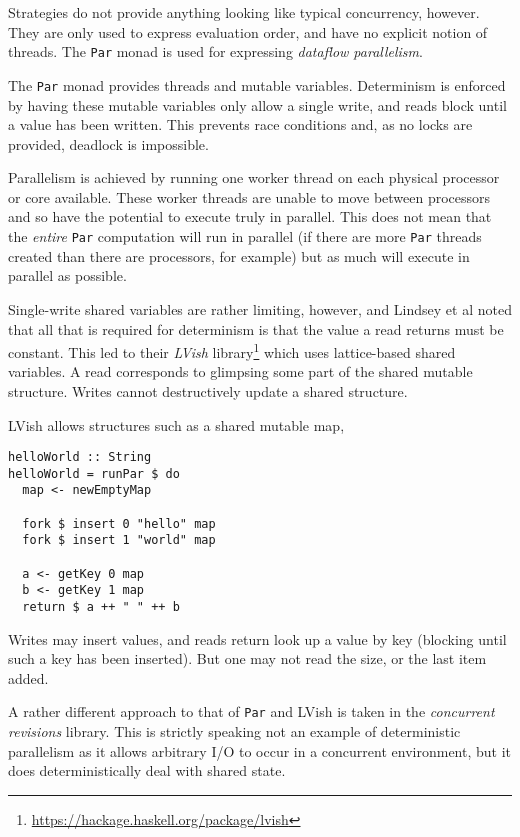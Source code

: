 Strategies do not provide anything looking like typical concurrency,
however. They are only used to express evaluation order, and have no
explicit notion of threads. The \verb|Par| monad\cite{parmonad} is
used for expressing \textit{dataflow parallelism}.

The \verb|Par| monad provides threads and mutable
variables. Determinism is enforced by having these mutable variables
only allow a single write, and reads block until a value has been
written. This prevents race conditions and, as no locks are provided,
deadlock is impossible.

Parallelism is achieved by running one worker thread on each physical
processor or core available. These worker threads are unable to move
between processors and so have the potential to execute truly in
parallel. This does not mean that the \textit{entire} \verb|Par|
computation will run in parallel (if there are more \verb|Par| threads
created than there are processors, for example) but as much will
execute in parallel as possible.

Single-write shared variables are rather limiting, however, and
Lindsey et al noted that all that is required for determinism is that
the value a read returns must be constant. This led to their
\textit{LVish}\cite{lvish}
library\footnote{\url{https://hackage.haskell.org/package/lvish}}
which uses lattice-based shared variables. A read corresponds to
glimpsing some part of the shared mutable structure. Writes cannot
destructively update a shared structure.

LVish allows structures such as a shared mutable map,

\begin{verbatim}
helloWorld :: String
helloWorld = runPar $ do
  map <- newEmptyMap

  fork $ insert 0 "hello" map
  fork $ insert 1 "world" map

  a <- getKey 0 map
  b <- getKey 1 map
  return $ a ++ " " ++ b
\end{verbatim}

Writes may insert values, and reads return look up a value by key
(blocking until such a key has been inserted). But one may not read
the size, or the last item added.

A rather different approach to that of \verb|Par| and LVish is taken
in the \textit{concurrent revisions}\cite{revisions} library. This is
strictly speaking not an example of deterministic parallelism as it
allows arbitrary I/O to occur in a concurrent environment, but it does
deterministically deal with shared state.


